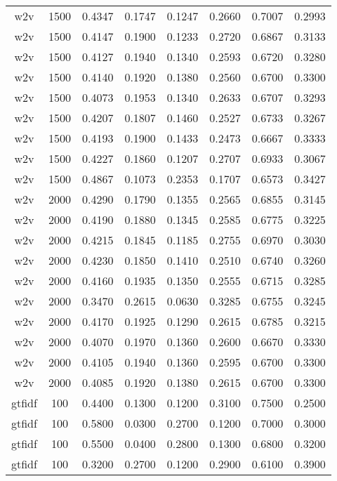 \begin{scriptsize}
\begin{longtable}{cccccccc}
	w2v      & 1500 & 0.4347 & 0.1747 & 0.1247 & 0.2660 & 0.7007 & 0.2993 \\
	w2v      & 1500 & 0.4147 & 0.1900 & 0.1233 & 0.2720 & 0.6867 & 0.3133 \\
	w2v      & 1500 & 0.4127 & 0.1940 & 0.1340 & 0.2593 & 0.6720 & 0.3280 \\
	w2v      & 1500 & 0.4140 & 0.1920 & 0.1380 & 0.2560 & 0.6700 & 0.3300 \\
	w2v      & 1500 & 0.4073 & 0.1953 & 0.1340 & 0.2633 & 0.6707 & 0.3293 \\
	w2v      & 1500 & 0.4207 & 0.1807 & 0.1460 & 0.2527 & 0.6733 & 0.3267 \\
	w2v      & 1500 & 0.4193 & 0.1900 & 0.1433 & 0.2473 & 0.6667 & 0.3333 \\
	w2v      & 1500 & 0.4227 & 0.1860 & 0.1207 & 0.2707 & 0.6933 & 0.3067 \\
	w2v      & 1500 & 0.4867 & 0.1073 & 0.2353 & 0.1707 & 0.6573 & 0.3427 \\
	w2v      & 2000 & 0.4290 & 0.1790 & 0.1355 & 0.2565 & 0.6855 & 0.3145 \\
	w2v      & 2000 & 0.4190 & 0.1880 & 0.1345 & 0.2585 & 0.6775 & 0.3225 \\
	w2v      & 2000 & 0.4215 & 0.1845 & 0.1185 & 0.2755 & 0.6970 & 0.3030 \\
	w2v      & 2000 & 0.4230 & 0.1850 & 0.1410 & 0.2510 & 0.6740 & 0.3260 \\
	w2v      & 2000 & 0.4160 & 0.1935 & 0.1350 & 0.2555 & 0.6715 & 0.3285 \\
	w2v      & 2000 & 0.3470 & 0.2615 & 0.0630 & 0.3285 & 0.6755 & 0.3245 \\
	w2v      & 2000 & 0.4170 & 0.1925 & 0.1290 & 0.2615 & 0.6785 & 0.3215 \\
	w2v      & 2000 & 0.4070 & 0.1970 & 0.1360 & 0.2600 & 0.6670 & 0.3330 \\
	w2v      & 2000 & 0.4105 & 0.1940 & 0.1360 & 0.2595 & 0.6700 & 0.3300 \\
	w2v      & 2000 & 0.4085 & 0.1920 & 0.1380 & 0.2615 & 0.6700 & 0.3300 \\
	gtfidf   & 100  & 0.4400 & 0.1300 & 0.1200 & 0.3100 & 0.7500 & 0.2500 \\
	gtfidf   & 100  & 0.5800 & 0.0300 & 0.2700 & 0.1200 & 0.7000 & 0.3000 \\
	gtfidf   & 100  & 0.5500 & 0.0400 & 0.2800 & 0.1300 & 0.6800 & 0.3200 \\
	gtfidf   & 100  & 0.3200 & 0.2700 & 0.1200 & 0.2900 & 0.6100 & 0.3900 \\

\end{longtable}
\end{scriptsize}
